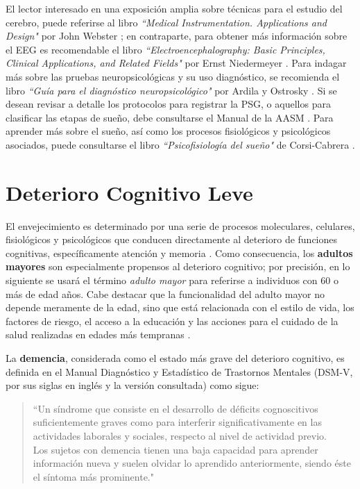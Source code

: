 \documentclass[12pt,letterpaper]{book}
\begin{document}
El lector interesado en una exposición amplia sobre técnicas para el estudio del cerebro, puede referirse al libro \textit{``Medical Instrumentation. Applications and Design"} por John Webster \cite{Webster}; en contraparte, para obtener más información sobre el EEG es recomendable el libro \textit{``Electroencephalography: Basic Principles, Clinical Applications, and Related Fields"} por Ernst Niedermeyer \cite{niedermeyer}.
%
Para indagar más sobre las pruebas neuropsicológicas y su uso diagnóstico, se recomienda el libro \textit{``Guía para el diagnóstico neuropsicológico"} por Ardila y Ostrosky \cite{Ardila12}.
%
Si se desean revisar a detalle los protocolos para registrar la PSG, o aquellos para clasificar las etapas de sueño, debe consultarse el Manual de la AASM \cite{AASM07}.
%
Para aprender más sobre el sueño, así como los procesos fisiológicos y psicológicos asociados, puede consultarse el libro \textit{``Psicofisiología del sueño"} de Corsi-Cabrera \cite{Corsi1983}.


\section{Deterioro Cognitivo Leve}
\label{seccion:dcl}

El envejecimiento es determinado por una serie de procesos moleculares, celulares, fisiológicos y psicológicos que conducen directamente al deterioro de funciones cognitivas, específicamente atención y memoria \cite{Park09}.
%
Como consecuencia, los \textbf{adultos mayores} son especialmente propensos al deterioro cognitivo; por precisión, en lo siguiente se usará el término \textit{adulto mayor} para referirse a individuos con 60 o más de edad años.
%
Cabe destacar que la funcionalidad del adulto mayor no depende meramente de la edad, sino que está relacionada con el estilo de vida, los factores de riesgo, el acceso a la educación y las acciones para el cuidado de la salud realizadas en edades más tempranas \cite{Sanhueza14}.
 
La \textbf{demencia}, considerada como el estado más grave del deterioro cognitivo, es definida en el Manual Diagnóstico y Estadístico de Trastornos Mentales (DSM-V, por sus siglas en inglés y la versión consultada) como sigue:
\begin{quote}
``Un síndrome que consiste en el desarrollo de déficits cognoscitivos suficientemente graves como para interferir significativamente en las actividades laborales y sociales, respecto al nivel de actividad previo.\\
%
Los sujetos con demencia tienen una baja capacidad para aprender información nueva y suelen olvidar lo aprendido anteriormente, siendo éste el síntoma más prominente."  \cite{DCM5}
\end{quote}
\end{document}
